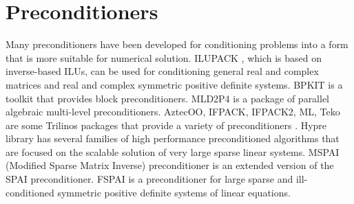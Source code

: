 \section{Preconditioners}
Many preconditioners have been developed for conditioning problems into a form that is more suitable for numerical solution. ILUPACK \cite{ilupack}, which is based on inverse-based ILUs, can be used for conditioning general real and complex matrices and real and complex symmetric positive definite systems. BPKIT \cite{bpkit} is a toolkit that provides block preconditioners. MLD2P4 \cite{mld2p4} is a package of parallel algebraic multi-level preconditioners. AztecOO, IFPACK, IFPACK2, ML, Teko are some Trilinos packages that provide a variety of preconditioners \cite{trilinos}. Hypre library \cite{hypre} has several families of high performance preconditioned algorithms that are focused on the scalable solution of very large sparse linear systems. MSPAI (Modified Sparse Matrix Inverse) \cite{mspai} preconditioner is an extended version of the SPAI \cite{spai} preconditioner. FSPAI \cite{fspai} is a preconditioner for large sparse and ill-conditioned symmetric positive definite systems of linear equations.

